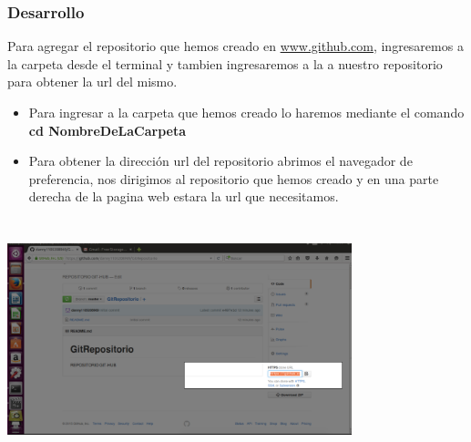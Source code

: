 \documentclass[8pt]{beamer}
\begin{document}
\begin{frame}
\frametitle{Desarrollo}


Para agregar el repositorio que hemos creado en \url{www.github.com}, ingresaremos a la carpeta desde el terminal y tambien ingresaremos a la a nuestro repositorio para obtener la url del mismo. 

\setlength{\parskip}{03pt}
\begin{center}
\begin{itemize}
\justifying
\item{Para ingresar a la carpeta que hemos creado lo haremos mediante el comando \textbf{cd NombreDeLaCarpeta}}
\justifying
\item{Para obtener la dirección url del repositorio abrimos el navegador de preferencia, nos dirigimos al repositorio que hemos creado y en una parte derecha de la pagina web estara la url que necesitamos.}
\end{itemize} 

\setlength{\parskip}{03pt}
\end{center}
\end{frame}

\begin{frame}
\setlength{\parskip}{10pt}
\includegraphics[width=10cm, height=7cm]{img/ocho}
\end{frame}
\end{document}
